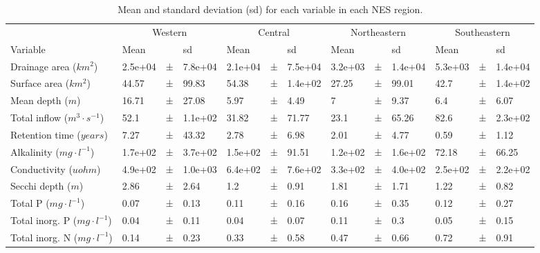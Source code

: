 \documentclass[journal abbreviations, manuscript]{copernicus}
\begin{document}
\begin{table}[t]
\caption{Mean and standard deviation (sd) for each variable in each NES region.}\label{table:means}
\begin{tabular}{lllllllllllll}
\tophline
\multicolumn{1}{l}{Region} & \multicolumn{3}{c}{Western} & \multicolumn{3}{c}{Central} & \multicolumn{3}{c}{Northeastern} & \multicolumn{3}{c}{Southeastern} \\ \cline{1-1} \cline{2-4} \cline{5-7} \cline{8-10} \cline{11-13}
Variable & Mean &   & sd & Mean &   & sd & Mean &   & sd & Mean &   & sd\\
\middlehline
Drainage area ($km^{2}$) & 2.5e+04 & ± & 7.8e+04 & 2.1e+04 & ± & 7.5e+04 & 3.2e+03 & ± & 1.4e+04 & 5.3e+03 & ± & 1.4e+04\\

Surface area ($km^{2}$) & 44.57 & ± & 99.83 & 54.38 & ± & 1.4e+02 & 27.25 & ± & 99.01 & 42.7 & ± & 1.4e+02\\

Mean depth ($m$) & 16.71 & ± & 27.08 & 5.97 & ± & 4.49 & 7 & ± & 9.37 & 6.4 & ± & 6.07\\

Total inflow ($m^{3} \cdot s^{-1}$) & 52.1 & ± & 1.1e+02 & 31.82 & ± & 71.77 & 23.1 & ± & 65.26 & 82.6 & ± & 2.3e+02\\

Retention time ($years$) & 7.27 & ± & 43.32 & 2.78 & ± & 6.98 & 2.01 & ± & 4.77 & 0.59 & ± & 1.12\\

Alkalinity ($mg \cdot l^{-1}$) & 1.7e+02 & ± & 3.7e+02 & 1.5e+02 & ± & 91.51 & 1.2e+02 & ± & 1.6e+02 & 72.18 & ± & 66.25\\

Conductivity ($uohm$) & 4.9e+02 & ± & 1.0e+03 & 6.4e+02 & ± & 7.6e+02 & 3.3e+02 & ± & 4.0e+02 & 2.5e+02 & ± & 2.2e+02\\

Secchi depth ($m$) & 2.86 & ± & 2.64 & 1.2 & ± & 0.91 & 1.81 & ± & 1.71 & 1.22 & ± & 0.82\\

Total P ($mg \cdot l^{-1}$) & 0.07 & ± & 0.13 & 0.11 & ± & 0.16 & 0.16 & ± & 0.35 & 0.12 & ± & 0.27\\

Total inorg. P ($mg \cdot l^{-1}$) & 0.04 & ± & 0.11 & 0.04 & ± & 0.07 & 0.11 & ± & 0.3 & 0.05 & ± & 0.15\\

Total inorg. N ($mg \cdot l^{-1}$) & 0.14 & ± & 0.23 & 0.33 & ± & 0.58 & 0.47 & ± & 0.66 & 0.72 & ± & 0.91\\


\end{tabular}
\end{table}
\end{document}
